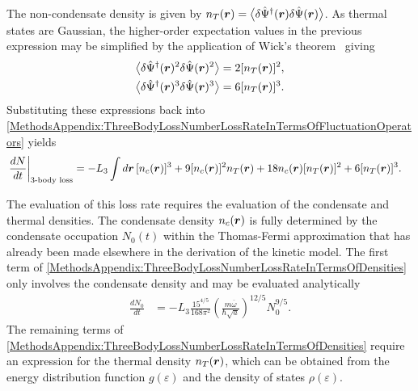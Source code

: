 The non-condensate density is given by $n_T(\bm{r}) = {\big<\delta\hat{\Psi}^\dagger(\bm{r}) \delta\hat{\Psi}(\bm{r})\big>}$.  As thermal states are Gaussian, the higher-order expectation values in the previous expression may be simplified by the application of Wick's theorem~\citep{Wick:1950} giving
\begin{align}
    {\ensuremath{\big<\delta\hat{\Psi}^\dagger(\bm{r})^2 \delta\hat{\Psi}(\bm{r})^2\big>}} &= 2 [n_T(\bm{r})]^2, \\
    {\big<\delta\hat{\Psi}^\dagger(\bm{r})^3 \delta\hat{\Psi}(\bm{r})^3\big>} &= 6 [n_T(\bm{r})]^3.
\end{align}
Substituting these expressions back into \eqref{MethodsAppendix:ThreeBodyLossNumberLossRateInTermsOfFluctuationOperators} yields
\begin{align}
    \left.\frac{d N}{dt} \right|_\text{3-body loss} &=  -L_3 \int d \vect{r}\, [n_c(\vect{r})]^3 + 9 [n_c(\vect{r})]^2 n_T(\vect{r}) + 18 n_c(\vect{r}) [n_T(\vect{r})]^2 + 6 [n_T(\vect{r})]^3.
    \label{MethodsAppendix:ThreeBodyLossNumberLossRateInTermsOfDensities}
\end{align}

The evaluation of this loss rate requires the evaluation of the condensate and thermal densities.  The condensate density $n_c(\bm{r})$ is fully determined by the condensate occupation $N_0(t)$ within the Thomas-Fermi approximation that has already been made elsewhere in the derivation of the kinetic model.  The first term of \eqref{MethodsAppendix:ThreeBodyLossNumberLossRateInTermsOfDensities} only involves the condensate density and may be evaluated analytically
\begin{align}
    \frac{d N_0}{dt} &= - L_3 \frac{15^{4/5}}{168 \pi^2} \left(\frac{m \overline{\omega}}{\hbar \sqrt{a}} \right)^{12/5} N_0^{9/5}.
\end{align}
The remaining terms of \eqref{MethodsAppendix:ThreeBodyLossNumberLossRateInTermsOfDensities} require an expression for the thermal density $n_T(\bm{r})$, which can be obtained from the energy distribution function $g(\varepsilon)$ and the density of states $\rho(\varepsilon)$.

